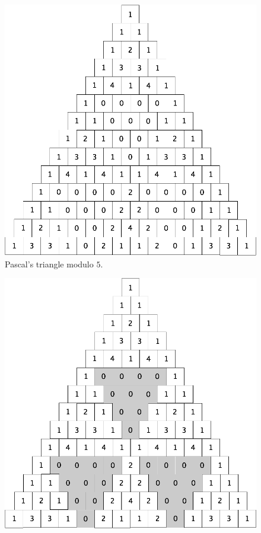 \begin{enumerate}
{\begin{figure}[ht]
\begin{center}
	\includegraphics[scale=0.2]{FiguresArithmetic/TrianglePascalModulo5init.png}
	        \caption{Pascal's triangle modulo $5$.}
        \label{fig:TriangleModulo5raw}
\end{center}
\end{figure}
\begin{figure}[ht]
\begin{center}
         \includegraphics[scale=0.2]{FiguresArithmetic/TrianglePascalModulo5.png}

\end{center}
\end{figure}}
\end{enumerate}
